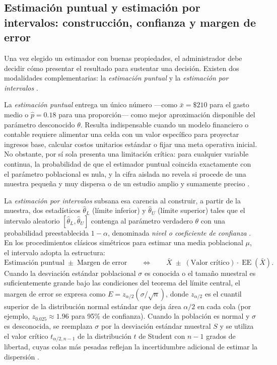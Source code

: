 {\subsection{Estimación puntual y estimación por intervalos: construcción, confianza y margen de error}
Una vez elegido un estimador con buenas propiedades, el administrador debe decidir cómo presentar el resultado para sustentar una decisión. Existen dos modalidades complementarias: la \textit{estimación puntual} y la \textit{estimación por intervalos} \citep[cap.~8]{holmesBusiness2023}.

La \textit{estimación puntual} entrega un único número —como $\bar{x}=\$210$ para el gasto medio o $\hat{p}=0.18$ para una proporción— como mejor aproximación disponible del parámetro desconocido $\theta$. Resulta indispensable cuando un modelo financiero o contable requiere alimentar una celda con un valor específico para proyectar ingresos base, calcular costos unitarios estándar o fijar una meta operativa inicial. No obstante, por sí sola presenta una limitación crítica: para cualquier variable continua, la probabilidad de que el estimador puntual coincida exactamente con el parámetro poblacional es nula, y la cifra aislada no revela si procede de una muestra pequeña y muy dispersa o de un estudio amplio y sumamente preciso \citep[sec.~8.1]{wackerly2010}.

La \textit{estimación por intervalos} subsana esa carencia al construir, a partir de la muestra, dos estadísticos $\hat{\theta}_L$ (límite inferior) y $\hat{\theta}_U$ (límite superior) tales que el intervalo aleatorio $[\hat{\theta}_L, \hat{\theta}_U]$ contenga al parámetro verdadero $\theta$ con una probabilidad preestablecida $1-\alpha$, denominada \textit{nivel o coeficiente de confianza} \citep[sec.~8.5]{wackerly2010}\citep[sec.~1.3.5.2]{nistHandbook}. En los procedimientos clásicos simétricos para estimar una media poblacional $\mu$, el intervalo adopta la estructura:
\[
  \text{Estimación puntual} \;\pm\; \text{Margen de error}
  \qquad\Longleftrightarrow\qquad
  \bar{X} \;\pm\; (\text{Valor crítico})\cdot \operatorname{EE}(\bar{X}).
\]
Cuando la desviación estándar poblacional $\sigma$ es conocida o el tamaño muestral es suficientemente grande bajo las condiciones del teorema del límite central, el margen de error se expresa como $E = z_{\alpha/2}(\sigma/\sqrt{n})$, donde $z_{\alpha/2}$ es el cuantil superior de la distribución normal estándar que deja área $\alpha/2$ en cada cola (por ejemplo, $z_{0.025}\approx 1.96$ para 95\% de confianza). Cuando la población es normal y $\sigma$ es desconocida, se reemplaza $\sigma$ por la desviación estándar muestral $S$ y se utiliza el valor crítico $t_{\alpha/2, n-1}$ de la distribución $t$ de Student con $n-1$ grados de libertad, cuyas colas más pesadas reflejan la incertidumbre adicional de estimar la dispersión \citep[secs.~8.1--8.2]{holmesBusiness2023}.

}
